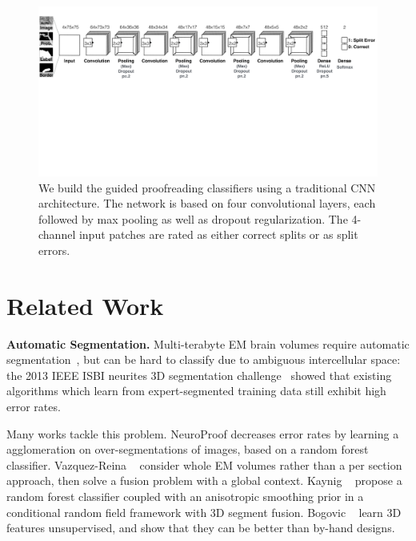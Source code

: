 \begin{figure}[t]
\begin{center}
\includegraphics[width=\linewidth]{gfx/architecture.pdf}
\end{center}
  \vspace{-4mm}
   \caption{We build the guided proofreading classifiers using a traditional CNN architecture. The network is based on four convolutional layers, each followed by max pooling as well as dropout regularization. The 4-channel input patches are rated as either correct splits or as split errors.}
\label{fig:architecture}
\end{figure}

\section{Related Work}

\textbf{Automatic Segmentation.} Multi-terabyte EM brain volumes require automatic segmentation~\cite{jain2010,Liu2014,NunezIglesias2013Machine,GALA2014}, but can be hard to classify due to ambiguous intercellular space: the 2013 IEEE ISBI neurites 3D segmentation challenge~\cite{isbi_challenge} showed that existing algorithms which learn from expert-segmented training data still exhibit high error rates. 

Many works tackle this problem. NeuroProof \cite{neuroproof2013} decreases error rates by learning a agglomeration on over-segmentations of images, based on a random forest classifier. Vazquez-Reina \etal~\cite{amelio_segmentation} consider whole EM volumes rather than a per section approach, then solve a fusion problem with a global context. Kaynig \etal~\cite{kaynig10} propose a random forest classifier coupled with an anisotropic smoothing prior in a conditional random field framework with 3D segment fusion. Bogovic \etal~\cite{BogovicHJ13} learn 3D features unsupervised, and show that they can be better than by-hand designs. 

